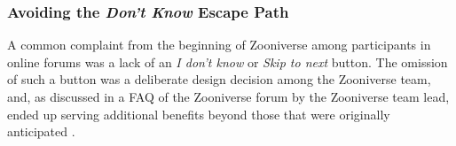 \documentclass{sigchi}
\begin{document}



\subsubsection{Avoiding the \emph{Don't Know} Escape Path}
A common complaint from the beginning of Zooniverse among participants in online forums was a lack of an \emph{I don't know} or \emph{Skip to next} button.  The omission of such a button was a deliberate design decision among the Zooniverse team, and, as discussed in a FAQ of the Zooniverse forum by the Zooniverse team lead, ended up serving additional benefits beyond those that were originally anticipated \cite{afron-blog-post}.
\end{document}
